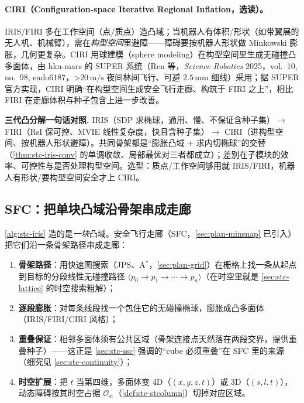 \paragraph{CIRI（Configuration-space Iterative Regional Inflation，选读）。}
IRIS/FIRI 多在工作空间（点/质点）造凸域；当机器人有体积/形状（如带翼展的无人机、机械臂），需在\emph{构型空间}里避障——障碍要按机器人形状做 Minkowski 膨胀，几何更复杂。CIRI 用球建模（sphere modeling）在构型空间里生成无碰撞凸多面体，由 hku-mars 的 SUPER 系统\cite{ren2025super}（Ren 等，\emph{Science Robotics} 2025，vol.\ 10, no.\ 98, eado6187，>$20\,\mathrm{m/s}$ 夜间林间飞行、可避 $2.5\,\mathrm{mm}$ 细线）采用；据 SUPER 官方实现，CIRI 明确“在构型空间生成安全飞行走廊、构筑于 FIRI 之上”，相比 FIRI 在走廊体积与种子包含上进一步改善。

\begin{note}
\textbf{三代凸分解一句话对照.}\;
IRIS（SDP 求椭球，通用、慢、不保证含种子集）$\to$ FIRI（RsI 保可控、MVIE 线性复杂度，快且含种子集）$\to$ CIRI（进构型空间、按机器人形状避障）。共同骨架都是“膨胀凸域 + 求内切椭球”的交替（\cref{thm:stc-iris-conv} 的单调收敛、局部最优对三者都成立）；差别在子模块的效率、可控性与是否处理构型空间。选型：质点/工作空间够用就 IRIS/FIRI，机器人有形状/要构型空间安全才上 CIRI。
\end{note}

\subsection{SFC：把单块凸域沿骨架串成走廊}
\label{sec:stc-sfc}

\cref{alg:stc-iris} 造的是\emph{一块}凸域。安全飞行走廊（SFC，\cref{sec:plan-minsnap} 已引入\cite{liu2017corridor}）把它们沿一条骨架路径串成走廊：
\begin{enumerate}
  \item \textbf{骨架路径}：用快速图搜索（JPS、A$^*$，\cref{sec:plan-grid}）在栅格上找一条从起点到目标的分段线性无碰撞路径 $\langle p_0\to p_1\to\cdots\to p_n\rangle$（在时空里就是 \cref{sec:stc-lattice} 的时空搜索粗解）；
  \item \textbf{逐段膨胀}：对每条线段找一个包住它的无碰撞椭球，膨胀成凸多面体（IRIS/FIRI/CIRI 风格）；
  \item \textbf{重叠保证}：相邻多面体须有公共区域（骨架连接点天然落在两段交界，提供重叠种子）——这正是 \cref{sec:stc-ssc} 强调的“cube 必须重叠”在 SFC 里的来源（细究见 \cref{sec:stc-continuity}）；
  \item \textbf{时空扩展}：把 $t$ 当第四维，多面体变 4D（$(x,y,z,t)$）或 3D（$(s,l,t)$），动态障碍按其时空占据 $\mathcal{O}_{\mathrm{st}}$（\cref{def:stc-stcolumn}）切掉对应区域。
\end{enumerate}

